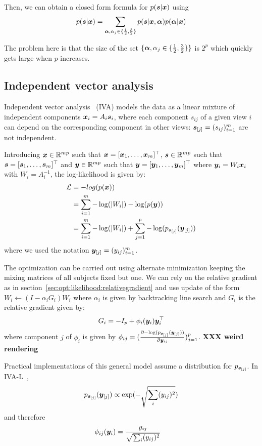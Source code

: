 Then, we can obtain a closed form formula for $p(\sbb | \xb)$ using
\begin{align}
  p(\sbb | \xb) = \sum_{\alphab, \alpha_j \in \{\frac12, \frac32\}} p(\sbb | \xb, \alphab) p(\alphab | \xb)
\end{align}

The problem here is that the size of the set $\{\alphab, \alpha_j \in
  \{\frac12, \frac32\} \}$ is $2^p$ which quickly gets large when $p$ increases.

\subsection{Independent vector analysis}
\label{sec:IVA}
Independent vector analysis~\cite{lee2008independent} (IVA) models the data as a
linear mixture of independent components $\xb_i = A_i \sbb_i$, where each
component $s_{ij}$ of a given view $i$ can depend on the corresponding component
in other views: $\sbb_{[j]} = (s_{ij})_{i=1}^m$ are not independent.

Introducing $\xb \in \RR^{mp}$ such that $\xb  = [\xb_1, \dots, \xb_m]^{\top}$,
$\sbb \in \RR^{mp}$ such that $\sbb = [\sbb_1, \dots, \sbb_m]^{\top}$ and $\yb
\in \RR^{mp}$ such that $\yb = [\yb_1, \dots, \yb_m]^{\top}$ where $\yb_i = W_i
\xb_i$ with $W_i = A_i^{-1}$, the
log-likelihood is given by:
\begin{align*}
  \loss &= - log(p(\xb)) \\
        &= \sum_{i=1}^m -\log(|W_i|) -\log(p(\yb)) \\
        &= \sum_{i=1}^m - \log(|W_i|) + \sum_{j=1}^p -\log(p_{\sbb_{[j]}}(\yb_{[j]}))
\end{align*}
where we used the notation $\yb_{[j]} = (y_{ij})_{i=1}^m$.

The optimization can be carried out using alternate minimization keeping the
mixing matrices of all subjects fixed but one. We can rely on the relative
gradient as in section~\ref{sec:opt:likelihood:relativegradient} and use update
of the form $W_i \leftarrow (I - \alpha_i G_i) W_i$ where $\alpha_i$ is given by
backtracking line search and $G_i$ is the relative gradient given by:
\begin{align}
  G_i = -I_p + \phi_i(\yb_i) \yb_i^{\top}
\end{align}
where component $j$ of $\phi_i$ is given by $\phi_{ij} = (\partialfrac{\yb_{ij}}{-\log(p_{\sbb_{[j]}}(\yb_{[j]}))})_{j=1}^p$.
\textbf{XXX weird rendering}

Practical implementations of this general model assume a distribution for
$p_{\sbb_{[j]}}$.
In IVA-L~\cite{lee2008independent},
\begin{align}
  p_{\sbb_{[j]}}(\yb_{[j]}) \propto \exp(-\sqrt{\sum_i (y_{ij})^2})
\end{align}
and therefore
\begin{align}
  \phi_{ij}(\yb_i) &= \frac{y_{ij}}{\sqrt{\sum_i (y_{ij})^2}}
\end{align}


